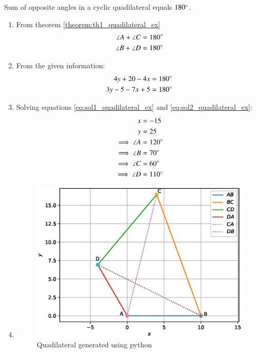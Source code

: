 \renewcommand{\theequation}{\theenumi}

\begin{theorem}\label{theorem:th1_quadilateral_ex}
Sum of opposite angles in a cyclic quadilateral equals $180\degree$.
\end{theorem}

\begin{enumerate}[label=\thesubsection.\arabic*.,ref=\thesubsection.\theenumi]

\item \solution  From theorem \ref{theorem:th1_quadilateral_ex}
\begin{align}
\angle A + \angle C &=  180\degree\\
\angle B + \angle D &=  180\degree
\end{align}

\item From the given information:
\begin{align}
4y+20-4x &= 180\degree \label{eq:sol1_quadilateral_ex} \\
3y-5-7x+5 &= 180\degree \label{eq:sol2_quadilateral_ex}
\end{align}

\item Solving equations \ref{eq:sol1_quadilateral_ex} and \ref{eq:sol2_quadilateral_ex}:
\begin{align}
x &= -15 \\
y &= 25 \\
\implies \angle A &= 120\degree \\
\implies \angle B &= 70\degree \\
\implies \angle C &= 60\degree \\
\implies \angle D &= 110\degree 
\end{align}


\item \begin{figure}[!ht]
\centering
\includegraphics[width=\columnwidth]{./figs/quadilateral_ex/cyclic_quad.eps}
\caption{Quadilateral generated using python}
\label{fig:cyclic_quad2_quadilateral_ex}
\end{figure} 


\end{enumerate}
